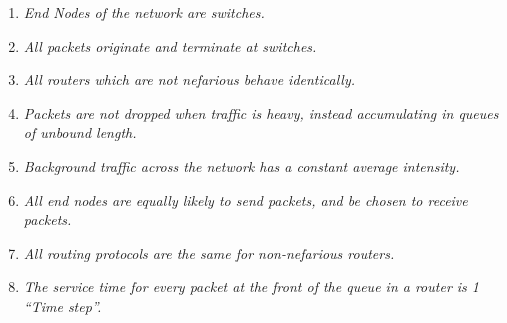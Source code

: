 \begin{enumerate}
\item \emph{End Nodes of the network are switches.}
\item \emph{All packets originate and terminate at switches.}
\item \emph{All routers which are not nefarious behave identically.}
\item \emph{Packets are not dropped when traffic is heavy, instead accumulating in queues of unbound length.}
\item \emph{Background traffic across the network has a constant average intensity.}
\item \emph{All end nodes are equally likely to send packets, and be chosen to receive packets.}
\item \emph{All routing protocols are the same for non-nefarious routers.}
\item \emph{The service time for every packet at the front of the queue in a router is 1 “Time step”.}
\end{enumerate}

